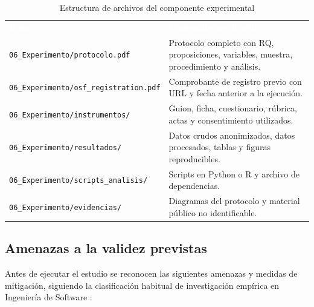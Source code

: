 \documentclass[12pt,a4paper]{article}
\begin{document}
\begin{table}[H]
\centering
\caption{Estructura de archivos del componente experimental}
\label{tab:estructura-experimento}
\small
{}
\begin{tabularx}{\textwidth}{L{4.2cm} Y}
\textcolor{white}{\textbf{Ruta}} &
\textcolor{white}{\textbf{Contenido verificable}}\\
\nolinkurl{06_Experimento/protocolo.pdf} & Protocolo completo con RQ, proposiciones, variables, muestra, procedimiento y análisis.\\
\nolinkurl{06_Experimento/osf_registration.pdf} & Comprobante de registro previo con URL y fecha anterior a la ejecución.\\
\nolinkurl{06_Experimento/instrumentos/} & Guion, ficha, cuestionario, rúbrica, actas y consentimiento utilizados.\\
\nolinkurl{06_Experimento/resultados/} & Datos crudos anonimizados, datos procesados, tablas y figuras reproducibles.\\
\nolinkurl{06_Experimento/scripts_analisis/} & Scripts en Python o R y archivo de dependencias.\\
\nolinkurl{06_Experimento/evidencias/} & Diagramas del protocolo y material público no identificable.\\
\end{tabularx}
\end{table}

\subsection{Amenazas a la validez previstas}

Antes de ejecutar el estudio se reconocen las siguientes amenazas y medidas de mitigación, siguiendo la clasificación habitual de investigación empírica en Ingeniería de Software \cite{wohlin2012,runeson2009}:
\end{document}
